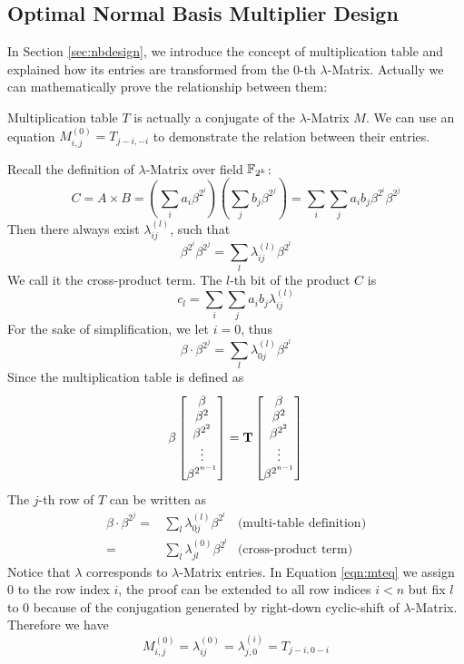 \subsection{Optimal Normal Basis Multiplier Design}
In Section \ref{sec:nbdesign}, we introduce the concept of multiplication table and explained how its 
entries are transformed from the $0$-th $\lambda$-Matrix. Actually we can mathematically prove the relationship 
between them:
\begin{Theorem}
Multiplication table $T$ is actually a conjugate of the $\lambda$-Matrix $M$. 
We can use an equation $M_{i,j}^{(0)} = T_{j-i,-i}$ to demonstrate the relation between their entries.
\end{Theorem}
\begin{Proof}
Recall the definition of $\lambda$-Matrix over field ${\mathbb{F}}_{2^k}$:
$$C = A\times B = \left(\sum_i a_i\beta^{2^i}\right)\left(\sum_jb_j\beta^{2^j}\right) = \sum_i\sum_ja_ib_j\beta^{2^i}\beta^{2^j}$$
Then there always exist $\lambda_{ij}^{(l)}$, such that 
$$\beta^{2^i}\beta^{2^j} = \sum_l\lambda_{ij}^{(l)}\beta^{2^l}$$
We call it the cross-product term. The $l$-th bit of the product $C$ is
$$c_l = \sum_i\sum_ja_ib_j\lambda_{ij}^{(l)}$$
For the sake of simplification, we let $i=0$, thus 
$$\beta\cdot\beta^{2^j} = \sum_l\lambda_{0j}^{(l)}\beta^{2^l}$$
Since the multiplication table is defined as
\begin{equation}
\beta
\begin{bmatrix}
\beta \\ \beta^2 \\ \beta^{2^2} \\ \vdots \\ \beta^{2^{n-1}}
\end{bmatrix}
= {\bf T}
\begin{bmatrix}
\beta \\ \beta^2 \\ \beta^{2^2} \\ \vdots \\ \beta^{2^{n-1}}
\end{bmatrix}
\end{equation}
The $j$-th row of $T$ can be written as
\begin{align}
\beta\cdot\beta^{2^j} =& \sum_l\lambda_{0j}^{(l)}\beta^{2^l} & \text{(multi-table definition)} \nonumber\\
					=& \sum_l\lambda_{jl}^{(0)}\beta^{2^l} & \text{(cross-product term)} \label{eqn:mteq}
\end{align}
Notice that $\lambda$ corresponds to $\lambda$-Matrix entries. In Equation \ref{eqn:mteq} we assign $0$ to the 
row index $i$, the proof can be extended to all row indices $i<n$ but fix $l$ to 0 because of the 
conjugation generated by right-down cyclic-shift of $\lambda$-Matrix. Therefore we have 
$$M_{i,j}^{(0)} = \lambda_{ij}^{(0)} = \lambda_{j,0}^{(i)} = T_{j-i,0-i}$$
\end{Proof}